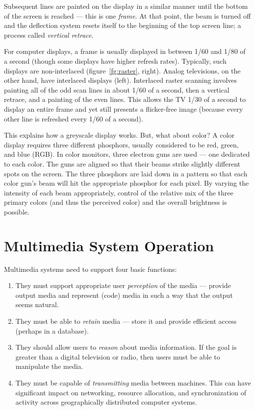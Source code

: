 Subsequent lines are painted on the display in a similar manner until
the bottom of the screen is reached --- this is one \emph{frame}. At
that point, the beam is turned off and the deflection system resets
itself to the beginning of the top screen line; a process called
\emph{vertical retrace}.

For computer displays, a frame is usually displayed in between 1/60
and 1/80 of a second (though some displays have higher refresh
rates). Typically, such displays are non-interlaced
(figure~\ref{fg:raster}, right). Analog televisions, on the other
hand, have interlaced displays (left). Interlaced raster scanning
involves painting all of the odd scan lines in about 1/60 of a second,
then a vertical retrace, and a painting of the even lines.  This
allows the TV 1/30 of a second to display an entire frame and yet
still presents a flicker-free image (because every other line is
refreshed every 1/60 of a second).

This explains how a greyscale display works. But, what about color? A
color display requires three different phosphors, usually considered
to be red, green, and blue (RGB). In color monitors, three electron
guns are used --- one dedicated to each color. The guns are aligned so
that their beams strike slightly different spots on the screen. The
three phosphors are laid down in a pattern so that each color gun's
beam will hit the appropriate phosphor for each pixel. By varying the
intensity of each beam appropriately, control of the relative mix of
the three primary colors (and thus the perceived color) and the
overall brightness is possible.

\section{Multimedia System Operation}

Multimedia systems need to support four basic functions:

\begin{enumerate}
\item They must support appropriate user \emph{perception} of the
media --- provide output media and represent (code) media in such a
way that the output seems natural.
\item They must be able to \emph{retain} media --- store it and
provide efficient access (perhaps in a database).
\item They should allow users to \emph{reason} about media
information.  If the goal is greater than a digital television or
radio, then users must be able to manipulate the media.
\item They must be capable of \emph{transmitting} media between
machines. This can have significant impact on networking, resource
allocation, and synchronization of activity across geographically
distributed computer systems.
\end{enumerate}

